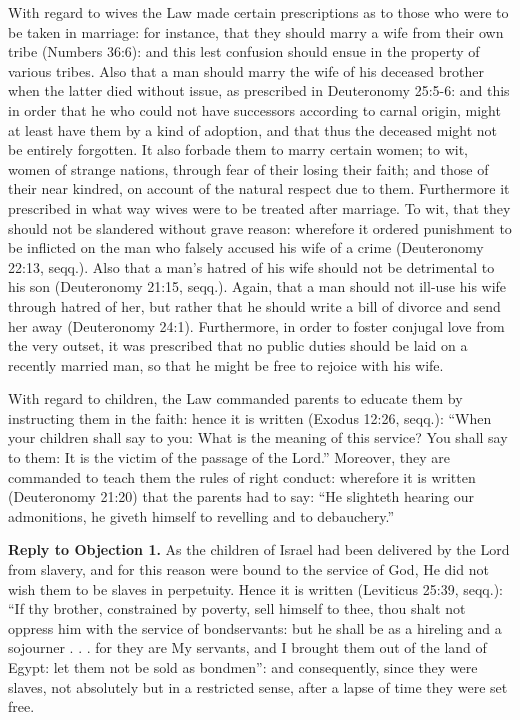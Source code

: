 With regard to wives the Law made certain prescriptions as to those who were to be taken in marriage: for instance, that they should marry a wife from their own tribe (Numbers 36:6): and this lest confusion should ensue in the property of various tribes. Also that a man should marry the wife of his deceased brother when the latter died without issue, as prescribed in Deuteronomy 25:5-6: and this in order that he who could not have successors according to carnal origin, might at least have them by a kind of adoption, and that thus the deceased might not be entirely forgotten. It also forbade them to marry certain women; to wit, women of strange nations, through fear of their losing their faith; and those of their near kindred, on account of the natural respect due to them. Furthermore it prescribed in what way wives were to be treated after marriage. To wit, that they should not be slandered without grave reason: wherefore it ordered punishment to be inflicted on the man who falsely accused his wife of a crime (Deuteronomy 22:13, seqq.). Also that a man's hatred of his wife should not be detrimental to his son (Deuteronomy 21:15, seqq.). Again, that a man should not ill-use his wife through hatred of her, but rather that he should write a bill of divorce and send her away (Deuteronomy 24:1). Furthermore, in order to foster conjugal love from the very outset, it was prescribed that no public duties should be laid on a recently married man, so that he might be free to rejoice with his wife.

With regard to children, the Law commanded parents to educate them by instructing them in the faith: hence it is written (Exodus 12:26, seqq.): ``When your children shall say to you: What is the meaning of this service? You shall say to them: It is the victim of the passage of the Lord.'' Moreover, they are commanded to teach them the rules of right conduct: wherefore it is written (Deuteronomy 21:20) that the parents had to say: ``He slighteth hearing our admonitions, he giveth himself to revelling and to debauchery.''

\textbf{Reply to Objection 1.} As the children of Israel had been delivered by the Lord from slavery, and for this reason were bound to the service of God, He did not wish them to be slaves in perpetuity. Hence it is written (Leviticus 25:39, seqq.): ``If thy brother, constrained by poverty, sell himself to thee, thou shalt not oppress him with the service of bondservants: but he shall be as a hireling and a sojourner . . . for they are My servants, and I brought them out of the land of Egypt: let them not be sold as bondmen'': and consequently, since they were slaves, not absolutely but in a restricted sense, after a lapse of time they were set free.

